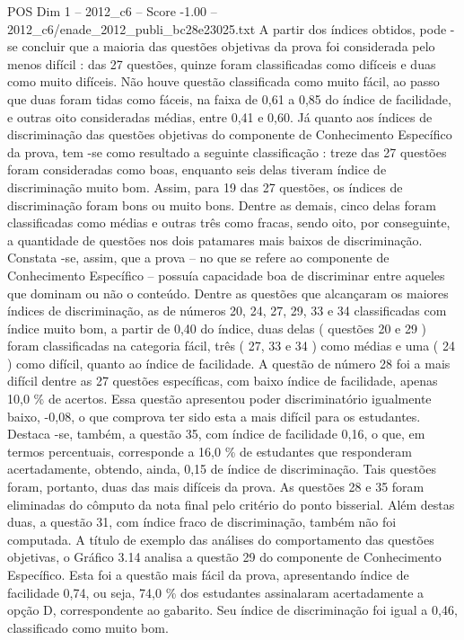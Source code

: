 \begin{textsample}{POS Dim 1 – 2012\_c6 – Score -1.00 – 2012\_c6/enade\_2012\_publi\_bc28e23025.txt}
A partir dos índices obtidos, pode -se concluir que a maioria das questões objetivas da prova foi considerada pelo menos difícil : das 27 questões, quinze foram classificadas como difíceis e duas como muito difíceis.
Não houve questão classificada como muito fácil, ao passo que duas foram tidas como fáceis, na faixa de 0,61 a 0,85 do índice de facilidade, e outras oito consideradas médias, entre 0,41 e 0,60.
Já quanto aos índices de discriminação das questões objetivas do componente de Conhecimento Específico da prova, tem -se como resultado a seguinte classificação : treze das 27 questões foram consideradas como boas, enquanto seis delas tiveram índice de discriminação muito bom.
Assim, para 19 das 27 questões, os índices de discriminação foram bons ou muito bons.
Dentre as demais, cinco delas foram classificadas como médias e outras três como fracas, sendo oito, por conseguinte, a quantidade de questões nos dois patamares mais baixos de discriminação.
Constata -se, assim, que a prova – no que se refere ao componente de Conhecimento Específico – possuía capacidade boa de discriminar entre aqueles que dominam ou não o conteúdo.
Dentre as questões que alcançaram os maiores índices de discriminação, as de números 20, 24, 27, 29, 33 e 34 classificadas com índice muito bom, a partir de 0,40 do índice, duas delas ( questões 20 e 29 ) foram classificadas na categoria fácil, três ( 27, 33 e 34 ) como médias e uma ( 24 ) como difícil, quanto ao índice de facilidade.
A questão de número 28 foi a mais difícil dentre as 27 questões específicas, com baixo índice de facilidade, apenas 10,0 \% de acertos.
Essa questão apresentou poder discriminatório igualmente baixo, -0,08, o que comprova ter sido esta a mais difícil para os estudantes.
Destaca -se, também, a questão 35, com índice de facilidade 0,16, o que, em termos percentuais, corresponde a 16,0 \% de estudantes que responderam acertadamente, obtendo, ainda, 0,15 de índice de discriminação.
Tais questões foram, portanto, duas das mais difíceis da prova.
As questões 28 e 35 foram eliminadas do cômputo da nota final pelo critério do ponto bisserial.
Além destas duas, a questão 31, com índice fraco de discriminação, também não foi computada.
A título de exemplo das análises do comportamento das questões objetivas, o Gráfico 3.14 analisa a questão 29 do componente de Conhecimento Específico.
Esta foi a questão mais fácil da prova, apresentando índice de facilidade 0,74, ou seja, 74,0 \% dos estudantes assinalaram acertadamente a opção D, correspondente ao gabarito.
Seu índice de discriminação foi igual a 0,46, classificado como muito bom.

\end{textsample}

